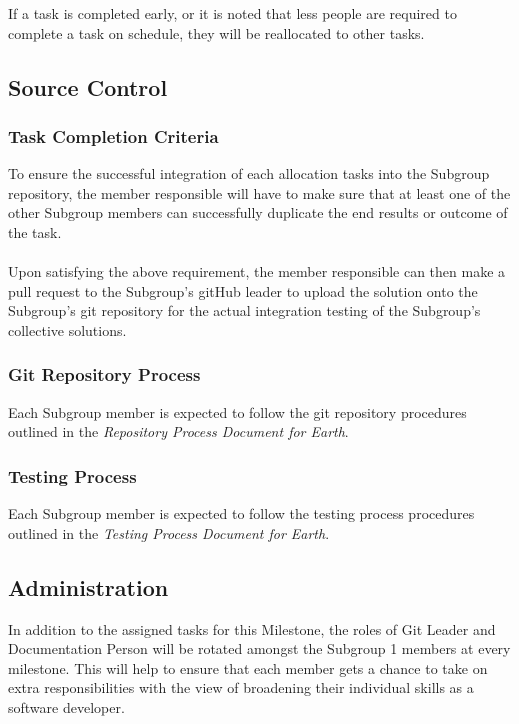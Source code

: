 \documentclass[10pt,a4,oneside]{article}
\begin{document}
If a task is completed early, or it is noted that less people are required to complete a task on schedule, they will be reallocated to other tasks.\\
 
\subsection{Source Control}

\subsubsection{Task Completion Criteria}

\noindent To ensure the successful integration of each allocation tasks into the Subgroup repository, the member responsible will have to make sure that at least one of the other Subgroup members can successfully duplicate the end results or outcome of the task.

\paragraph{}
\noindent Upon satisfying the above requirement, the member responsible can then make a pull request to the Subgroup's gitHub leader to upload the solution onto the Subgroup's git repository for the actual integration testing of the Subgroup's collective solutions. 


\subsubsection{Git Repository Process}

\noindent Each Subgroup member is expected to follow the git repository procedures outlined in the \emph{Repository Process Document for Earth}.
 

\subsubsection{Testing Process}
\noindent Each Subgroup member is expected to follow the testing process procedures outlined in the \emph{Testing Process Document for Earth}.


\subsection{Administration}

In addition to the assigned tasks for this Milestone, the roles of Git Leader and Documentation Person will be rotated amongst the Subgroup 1 members at every milestone. This will help to ensure that each member gets a chance to take on extra responsibilities with the view of broadening their individual skills as a software developer.
\end{document}
